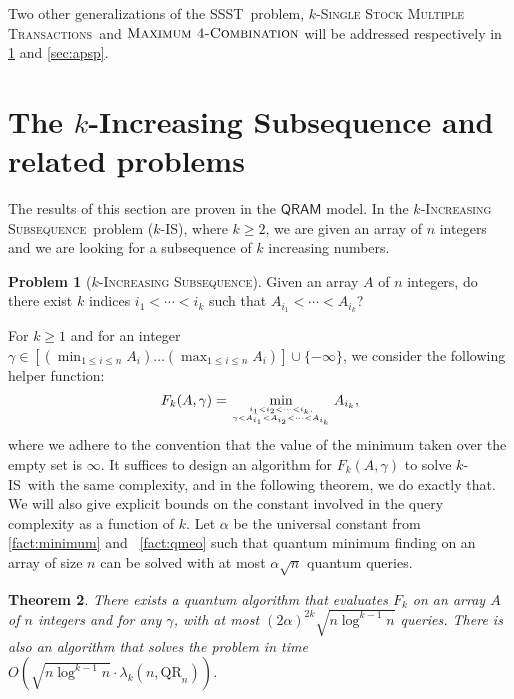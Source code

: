 \documentclass[12pt]{article}
\newcommand{\qr}{\mathrm{QR}}
\newcommand{\MaxFourCf}{\textsc{Maximum 4-Combination}}
\newcommand{\SSST}{\textsc{SSST}}
\newcommand{\ISf}{\textsc{Increasing Subsequence}}
\newcommand{\IS}{\textsc{IS}}
\newcommand{\SSMTf}{\textsc{Single Stock Multiple Transactions}}
\newtheorem{theorem}{Theorem}
\theoremstyle{definition}
\newtheorem{problem}[theorem]{Problem}
\begin{document}
Two other generalizations of the \SSST \ problem, $k$-\SSMTf \ and $\MaxFourCf$ will be addressed respectively in \cref{sec:is} and \cref{sec:apsp}.



\section{The $k$-Increasing Subsequence and related problems}
\label{sec:is}
The results of this section are proven in the $\mathsf{QRAM}$ model.
In the $k$-\ISf \ problem ($k$-\IS), where $k \geq 2$, we are given an array of $n$ integers and we are looking for a subsequence of $k$ increasing numbers.
\begin{problem}[$k$-\ISf]
Given an array $A$ of $n$ integers, do there exist $k$ indices $i_1 < \cdots < i_k$ such that $A_{i_1} < \cdots < 
A_{i_k}$?
\end{problem} 
For $k \geq 1$ and for an integer $\gamma \in [(\min_{1 \leq i \leq n} A_i) \ldots (\max_{1 \leq i \leq n}  A_i)] \cup \{-\infty\}$, we consider the following helper function:
\[
F_k(A,\gamma) = \min_{i_1 < i_2 < \cdots < i_k, \atop \gamma < A_{i_1} < A_{i_2} < \cdots < A_{i_k}} A_{i_k},
\]
where we adhere to the convention that the value of the minimum taken over the empty set is $\infty$.
It suffices to design an algorithm for $F_k(A, \gamma)$ to solve $k$-\IS \ with the same complexity, and in the following theorem, we do exactly that. 
We will also give explicit bounds on the constant involved in the query complexity as a 
function of $k$.
Let $\alpha$ be the universal 
constant from \cref{fact:minimum} and ~\cref{fact:qmeo} such that quantum minimum finding on an array of size $n$ can be solved with at most $\alpha \sqrt{n}$ quantum queries.  

\begin{theorem}
\label{thm:k-is}
There exists a quantum algorithm that evaluates $F_k$ on an array $A$ of $n$ integers and for any $\gamma$, with at most 
$(2\alpha)^{2k} \sqrt{n \log^{k-1} n}$ queries. 
There is also an algorithm that solves the problem in time $O(\sqrt{n \log^{k-1} n} \cdot  \lambda_k(n,\qr_n))$.
\end{theorem}
\end{document}
